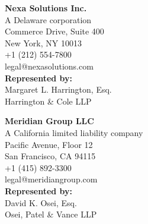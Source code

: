 \documentclass[11pt,a4paper]{article}
\begin{document}
\noindent
\begin{minipage}[t]{0.475\linewidth}
  \begin{tcolorbox}[partystyle, title={\faBuilding\quad CLAIMANT}]
    \sffamily\small
    \textbf{Nexa Solutions Inc.}\\[3pt]
    {\color{MidGray}A Delaware corporation}\\[4pt]
    \faMapMarker*{} Commerce Drive, Suite 400\\
    \phantom{\faMapMarker*\;} New York, NY 10013\\[3pt]
    \faPhone\; +1 (212) 554-7800\\
    \faEnvelope\; legal@nexasolutions.com\\[4pt]
    \textbf{Represented by:}\\
    Margaret L. Harrington, Esq.\\
    {\color{MidGray}Harrington \& Cole LLP}
  \end{tcolorbox}
\end{minipage}%
\hfill
\begin{minipage}[t]{0.475\linewidth}
  \begin{tcolorbox}[partystyle, title={\faBuilding\quad RESPONDENT}]
    \sffamily\small
    \textbf{Meridian Group LLC}\\[3pt]
    {\color{MidGray}A California limited liability company}\\[4pt]
    \faMapMarker*{} Pacific Avenue, Floor 12\\
    \phantom{\faMapMarker*\;} San Francisco, CA 94115\\[3pt]
    \faPhone\; +1 (415) 892-3300\\
    \faEnvelope\; legal@meridiangroup.com\\[4pt]
    \textbf{Represented by:}\\
    David K. Osei, Esq.\\
    {\color{MidGray}Osei, Patel \& Vance LLP}
  \end{tcolorbox}
\end{minipage}

\vspace{6mm}
\end{document}
